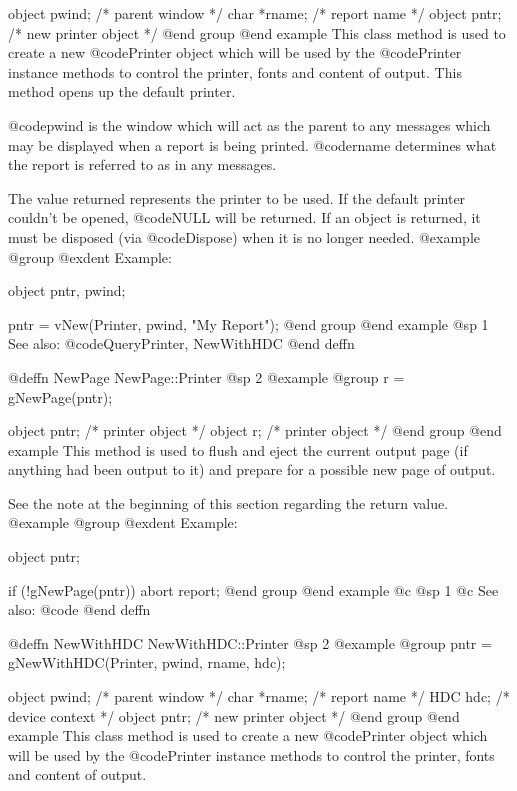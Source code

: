 object  pwind;  /*  parent window       */
char    *rname; /*  report name         */
object  pntr;   /*  new printer object  */
@end group
@end example
This class method is used to create a new @code{Printer} object which
will be used by the @code{Printer} instance methods to control the
printer, fonts and content of output.  This method opens up the
default printer.

@code{pwind} is the window which will act as the parent to any
messages which may be displayed when a report is being printed.
@code{rname} determines what the report is referred to as in any
messages.

The value returned represents the printer to be used.  If the default
printer couldn't be opened, @code{NULL} will be returned.  If an object
is returned, it must be disposed (via @code{Dispose}) when it is no
longer needed.
@example
@group
@exdent Example:

object  pntr, pwind;

pntr = vNew(Printer, pwind, "My Report");
@end group
@end example
@sp 1
See also:  @code{QueryPrinter, NewWithHDC}
@end deffn











@deffn {NewPage} NewPage::Printer
@sp 2
@example
@group
r = gNewPage(pntr); 

object  pntr;   /*  printer object  */
object  r;      /*  printer object  */
@end group
@end example
This method is used to flush and eject the current output page (if anything
had been output to it) and prepare for a possible new page of output.

See the note at the beginning of this section regarding the return value.
@example
@group
@exdent Example:

object  pntr;

if (!gNewPage(pntr))
        abort report;
@end group
@end example
@c @sp 1
@c See also:  @code{}
@end deffn













@deffn {NewWithHDC} NewWithHDC::Printer
@sp 2
@example
@group
pntr = gNewWithHDC(Printer, pwind, rname, hdc); 

object  pwind;  /*  parent window       */
char    *rname; /*  report name         */
HDC     hdc;    /*  device context      */
object  pntr;   /*  new printer object  */
@end group
@end example
This class method is used to create a new @code{Printer} object which
will be used by the @code{Printer} instance methods to control the
printer, fonts and content of output.


